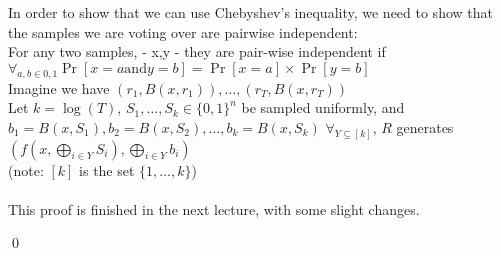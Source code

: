 In order to show that we can use Chebyshev's inequality, we need to show that the samples we are voting over are pairwise independent:\\
For any two samples, - x,y - they are pair-wise independent if $\forall_{a,b \in {0,1}} \Pr[x=a \text{and} y=b] = \Pr[x=a] \times \Pr[y=b]$\\

	Imagine we have $(r_1, B(x, r_1)), \ldots, (r_T, B(x,r_T))$\\
	Let $k = \log(T)$, $S_1, \ldots, S_k \in \{0,1\}^n$ be sampled uniformly, and $b_1 = B(x, S_1), b_2 = B(x, S_2), \ldots, b_k = B(x, S_k)$
	$\forall_{Y \subseteq [k]}$, $R$ generates $(f(x, \bigoplus_{i \in Y} S_i), \bigoplus_{i \in Y} b_i)$\\
	(note: $[k]$ is the set $\{1,\ldots, k\}$)\\
	\\
	This proof is finished in the next lecture, with some slight changes.

\qed


